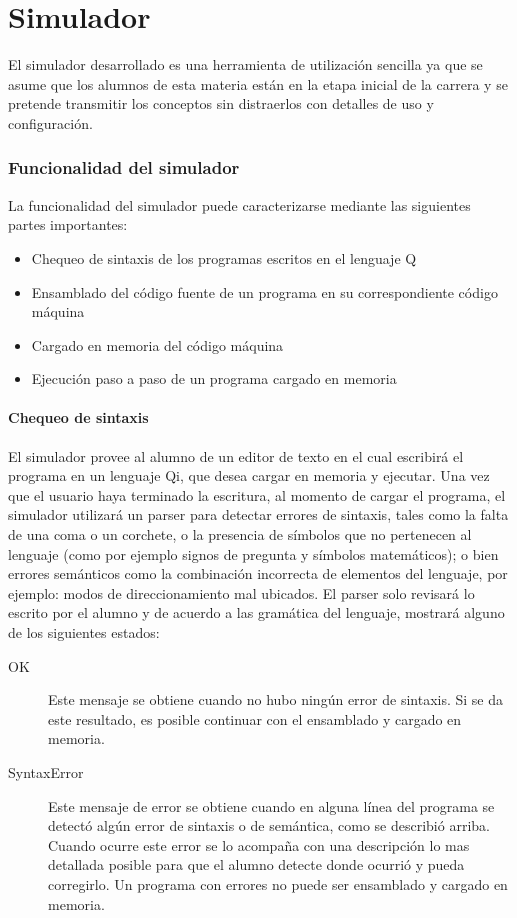 \part{Simulador \qsim}


El simulador desarrollado es una herramienta de utilización sencilla ya que se asume que los alumnos de esta materia están en la etapa inicial de la carrera y se pretende transmitir los conceptos sin distraerlos con detalles de uso y configuración.

\section{Funcionalidad del simulador}

La funcionalidad del simulador puede caracterizarse mediante las siguientes partes importantes:

\begin{itemize}
\item Chequeo de sintaxis de los programas escritos en el lenguaje Q
\item Ensamblado del código fuente de un programa en su correspondiente código máquina
\item Cargado en memoria del código máquina
\item Ejecución paso a paso de un programa cargado en memoria
\end{itemize}

\subsection{Chequeo de sintaxis}

El simulador provee al alumno de un editor de texto en el cual escribirá el programa en un lenguaje Qi, que desea cargar en memoria y ejecutar.
Una vez que el usuario haya terminado la escritura, al momento de cargar el programa, el simulador utilizará un parser para detectar errores de sintaxis, tales como la falta de una coma o un corchete, o la presencia de símbolos que no pertenecen al lenguaje (como por ejemplo signos de pregunta y símbolos matemáticos); o bien errores semánticos como la combinación incorrecta de elementos del lenguaje, por ejemplo: modos de direccionamiento mal ubicados.
El parser solo revisará lo escrito por el alumno y de acuerdo a las gramática del lenguaje, mostrará alguno de los siguientes estados:

\begin{description}
\item[OK] Este mensaje se obtiene cuando no hubo ningún error de sintaxis. Si se da este resultado, es posible continuar con el ensamblado y cargado en memoria.
\item[SyntaxError] Este mensaje de error se obtiene cuando en alguna línea del programa se detectó algún error de sintaxis o de semántica, como se describió arriba. Cuando ocurre este error se lo acompaña con una descripción lo mas detallada posible para que el alumno detecte donde ocurrió y pueda corregirlo. Un programa con errores no puede ser ensamblado y cargado en memoria.
\end{description}

